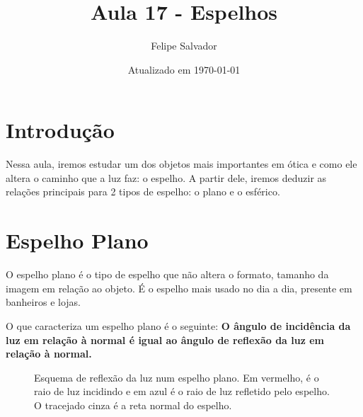 \documentclass[12pt]{extarticle}
\title{Aula 17 - Espelhos}
\author{Felipe Salvador}
\date{Atualizado em \today}
\newcommand{\<}{\langle}
\renewcommand{\>}{\rangle}
\theoremstyle{definition}
\begin{document}
\maketitle

\section{Introdução}
Nessa aula, iremos estudar um dos objetos mais importantes em ótica e como ele altera o caminho que a luz faz: o espelho. A partir dele, iremos deduzir as relações principais para 2 tipos de espelho: o plano e o esférico.

\section{Espelho Plano}
O espelho plano é o tipo de espelho que não altera o formato, tamanho da imagem em relação ao objeto. É o espelho mais usado no dia a dia, presente em banheiros e lojas.

O que caracteriza um espelho plano é o seguinte: \textbf{O ângulo de incidência da luz em relação à normal é igual ao ângulo de reflexão da luz em relação à normal.}

\begin{figure}[H]
    \centering
    \caption{Esquema de reflexão da luz num espelho plano. Em vermelho, é o raio de luz incidindo e em azul é o raio de luz refletido pelo espelho. O tracejado cinza é a reta normal do espelho.}
    \label{fig:my_label}
\end{figure}
\end{document}
